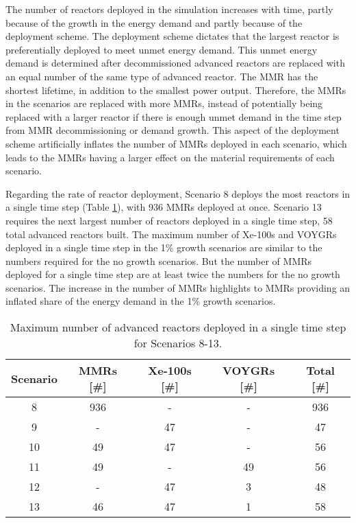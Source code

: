 The number 
of reactors deployed in the simulation increases with time, 
partly because of the growth in the energy demand and partly 
because of the deployment scheme. The deployment scheme 
dictates that the largest reactor is preferentially deployed to 
meet unmet energy demand. This unmet energy demand is determined 
after decommissioned advanced reactors are replaced with an 
equal number of the same type of advanced reactor. The \gls{MMR} 
has the shortest lifetime, in addition to the smallest power 
output. Therefore, the \glspl{MMR} in the scenarios are replaced with more 
\glspl{MMR}, instead of potentially being replaced with a larger 
reactor if there is enough unmet demand in the time step from 
\gls{MMR} decommissioning or demand growth. 
This aspect of the deployment scheme artificially 
inflates the number of \glspl{MMR} deployed in each scenario, 
which leads to the \glspl{MMR} having a larger effect on the 
material requirements of each scenario. 

Regarding the rate of reactor deployment, Scenario 8 deploys the most 
reactors in a single time step (Table 
\ref{tab:reactors_added_1percent}), with 936 \glspl{MMR} deployed at once. 
Scenario 13 requires the next largest number of reactors deployed in 
a single time step, 58 total advanced reactors built.
The maximum number of Xe-100s and VOYGRs deployed in a single time 
step in the 1\% growth scenarios are similar to the numbers required 
for the no growth scenarios. But the number of \glspl{MMR} 
deployed for a single time step are at least twice the numbers 
for the no growth scenarios. The increase in the number of 
\glspl{MMR} highlights to \glspl{MMR} providing an inflated 
share of the energy demand in the 1\% growth scenarios. 

\begin{table}
    \centering 
    \caption{Maximum number of advanced reactors deployed in a single 
    time step for Scenarios 8-13.}
    \label{tab:reactors_added_1percent}
    \begin{tabular}{c c c c c}
        \hline
        Scenario & \glspl{MMR} [\#] & Xe-100s [\#] & VOYGRs [\#] 
        & Total [\#]\\\hline
        8 & 936 & - & - & 936\\
        9 & - & 47 & - & 47\\
        10 & 49 & 47 & - & 56\\
        11 & 49 & - & 49 & 56\\
        12 & - & 47 & 3 & 48\\
        13 & 46 & 47 & 1 & 58\\
        \hline
    \end{tabular}
\end{table}

